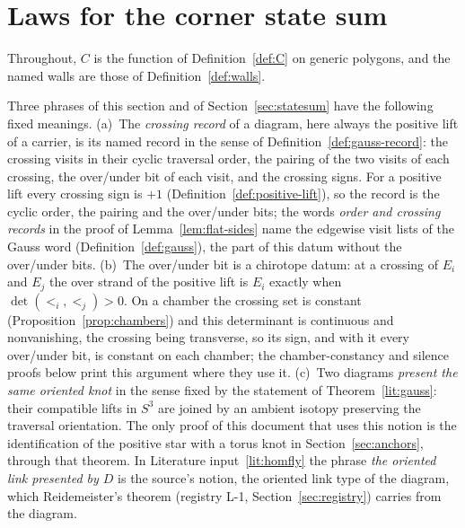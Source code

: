 \section{Laws for the corner state sum}\label{sec:knotlaws}

Throughout, $C$ is the function of Definition~\ref{def:C} on generic
polygons, and the named walls are those of Definition~\ref{def:walls}.

\begin{remark}\label{rem:crossing-record}
Three phrases of this section and of Section~\ref{sec:statesum} have the
following fixed meanings. (a)~The \emph{crossing record} of a diagram, here
always the positive lift of a carrier, is its named record in the sense of
Definition~\ref{def:gauss-record}: the crossing visits in their cyclic
traversal order, the pairing of the two visits of each crossing, the
over/under bit of each visit, and the crossing signs. For a positive lift
every crossing sign is $+1$ (Definition~\ref{def:positive-lift}), so the
record is the cyclic order, the pairing and the over/under bits; the words
\emph{order and crossing records} in the proof of Lemma~\ref{lem:flat-sides}
name the edgewise visit lists of the Gauss word
(Definition~\ref{def:gauss}), the part of this datum without the over/under
bits. (b)~The over/under bit is a chirotope datum: at a crossing of $E_i$
and $E_j$ the over strand of the positive lift is $E_i$ exactly when
$\det(\lt_i,\lt_j)>0$. On a chamber the crossing set is constant
(Proposition~\ref{prop:chambers}) and this determinant is continuous and
nonvanishing, the crossing being transverse, so its sign, and with it every
over/under bit, is constant on each chamber; the chamber-constancy and
silence proofs below print this argument where they use it. (c)~Two diagrams
\emph{present the same oriented knot} in the sense fixed by the statement of
Theorem~\ref{lit:gauss}: their compatible lifts in $S^3$ are joined by an
ambient isotopy preserving the traversal orientation. The only proof of this
document that uses this notion is the identification of the positive star
with a torus knot in Section~\ref{sec:anchors}, through that theorem. In
Literature input~\ref{lit:homfly} the phrase \emph{the oriented link presented
by $D$} is the source's notion, the oriented link type of the diagram, which
Reidemeister's theorem (registry L-1, Section~\ref{sec:registry}) carries
from the diagram.
\end{remark}

